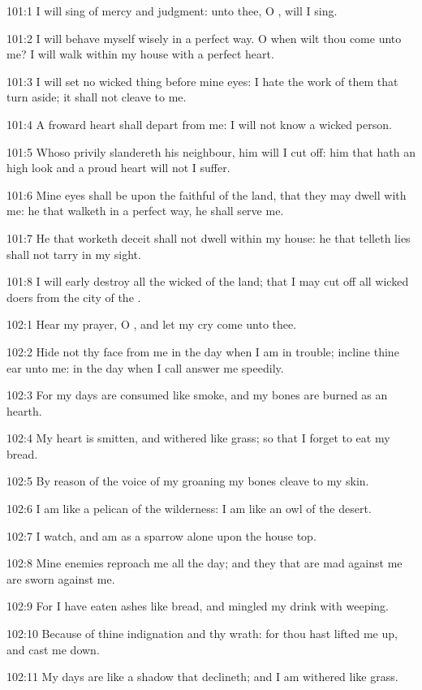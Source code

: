 101:1 I will sing of mercy and judgment: unto thee, O \LORD, will I
sing.

101:2 I will behave myself wisely in a perfect way. O when wilt thou
come unto me? I will walk within my house with a perfect heart.

101:3 I will set no wicked thing before mine eyes: I hate the work of
them that turn aside; it shall not cleave to me.

101:4 A froward heart shall depart from me: I will not know a wicked
person.

101:5 Whoso privily slandereth his neighbour, him will I cut off: him
that hath an high look and a proud heart will not I suffer.

101:6 Mine eyes shall be upon the faithful of the land, that they may
dwell with me: he that walketh in a perfect way, he shall serve me.

101:7 He that worketh deceit shall not dwell within my house: he that
telleth lies shall not tarry in my sight.

101:8 I will early destroy all the wicked of the land; that I may cut
off all wicked doers from the city of the \LORD.



102:1 Hear my prayer, O \LORD, and let my cry come unto thee.

102:2 Hide not thy face from me in the day when I am in trouble;
incline thine ear unto me: in the day when I call answer me speedily.

102:3 For my days are consumed like smoke, and my bones are burned as
an hearth.

102:4 My heart is smitten, and withered like grass; so that I forget
to eat my bread.

102:5 By reason of the voice of my groaning my bones cleave to my
skin.

102:6 I am like a pelican of the wilderness: I am like an owl of the
desert.

102:7 I watch, and am as a sparrow alone upon the house top.

102:8 Mine enemies reproach me all the day; and they that are mad
against me are sworn against me.

102:9 For I have eaten ashes like bread, and mingled my drink with
weeping.

102:10 Because of thine indignation and thy wrath: for thou hast
lifted me up, and cast me down.

102:11 My days are like a shadow that declineth; and I am withered
like grass.

